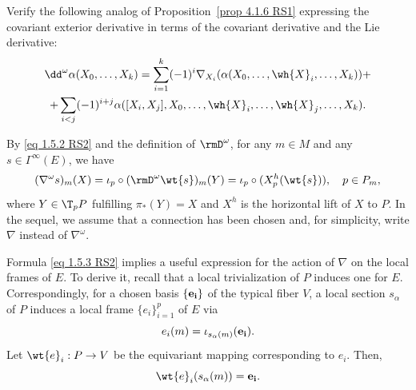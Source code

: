 \begin{xca}
    Verify the following analog of Proposition~\ref{prop 4.1.6 RS1} expressing the covariant exterior derivative in terms of the covariant derivative and the Lie derivative:
        \begin{multline}
            \dd^\omega \alpha(X_0,\ldots,X_k)= \sum_{i=1}^k(-1)^i \nabla_{X_i}(\alpha(X_0,\ldots,\wh{X}_i,\ldots,X_k))+\\+\sum_{i<j}(-1)^{i+j}\alpha([X_i,X_j],X_0,\ldots,\wh{X}_i,\ldots,\wh{X}_j,\ldots,X_k).
        \end{multline}
\end{xca}

By \eqref{eq 1.5.2 RS2} and the definition of $\rmD^\omega$, for any $m\in M$ and any $s\in \Gamma^\infty(E)$, we have
\[(\nabla^\omega s)_m(X)=\iota_p\circ (\rmD^\omega \wt{s})_m(Y)=\iota_p\circ (X_p^h(\wt{s})),\quad p\in P_m,\label{eq 1.5.3 RS2}\]
where $Y\in \T_pP$ fulfilling $\pi_\ast(Y)=X$ and $X^h$ is the horizontal lift of $X$ to $P$. In the sequel, we assume that a connection has been chosen and, for simplicity, write $\nabla$ instead of $\nabla^\omega$.

Formula \eqref{eq 1.5.3 RS2} implies a useful expression for the action of $\nabla$ on the local frames of $E$. To derive it, recall that a local trivialization of $P$ induces one for $E$. Correspondingly, for a chosen basis $\{\bf{e}_i\}$ of the typical fiber $V$, a local section $s_\alpha$ of $P$ induces a local frame $\{e_i\}_{i=1}^p$ of $E$ via
\[e_i(m)=\iota_{s_\alpha(m)}(\bf{e}_i).\label{eq 1.5.4 RS2}\]
Let $\wt{e}_i:P\to V$ be the equivariant mapping corresponding to $e_i$. Then,
\[\wt{e}_i(s_\alpha(m))=\bf{e}_i.\label{eq 1.5.5 RS2}\]

